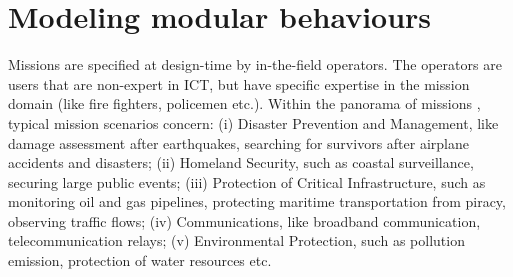 \documentclass[journal]{IEEEtran}
\theoremstyle{definition}
\newcommand\darko[1]{\nb{Darko}{#1}}
\newcommand\patrizio[1]{\nb{Patrizio}{#1}}
\begin{document}





\section{Modeling modular behaviours}







Missions are specified at design-time by in-the-field operators. The operators are users that are non-expert in ICT, but have specific expertise in the mission domain (like  fire fighters, policemen etc.). Within the panorama of missions \cite{skrzypietz2012unmanned}, typical mission scenarios concern: (i) Disaster Prevention and Management, like damage
assessment after earthquakes, searching for survivors after
airplane accidents and disasters; (ii) Homeland Security, such
as coastal surveillance, securing large public events; (iii) Protection
of Critical Infrastructure, such as monitoring oil and
gas pipelines, protecting maritime transportation from piracy,
observing traffic flows; (iv) Communications, like broadband
communication, telecommunication relays; (v) Environmental
Protection, such as pollution emission, protection of water
resources etc.
\end{document}
